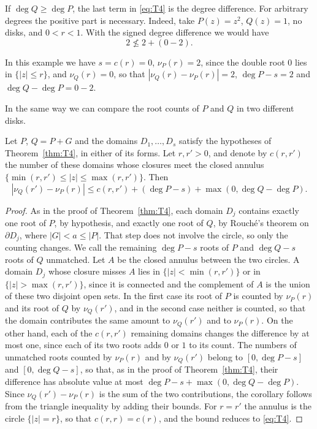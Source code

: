 \begin{remark}\label{rem:T4-degree}
If $\deg Q\geq\deg P$, the last term in \eqref{eq:T4} is the degree difference.
For arbitrary degrees the positive part is necessary. Indeed, take
$P(z)=z^2$, $Q(z)=1$, no disks, and $0<r<1$. With the signed degree
difference we would have
\[
 2\nleq2+(0-2).
\]
\end{remark}
In this example we have $s=c(r)=0$, $\nu_P(r)=2$, since the double root $0$
lies in $\{|z|\le r\}$, and $\nu_Q(r)=0$, so that $|\nu_Q(r)-\nu_P(r)|=2$,
$\deg P-s=2$ and $\deg Q-\deg P=0-2$.

In the same way we can compare the root counts of $P$ and $Q$ in two
different disks.

\begin{corollary}\label{cor:T4-two-radii}
Let $P$, $Q=P+G$ and the domains $D_1,\ldots,D_s$ satisfy the hypotheses of
Theorem~\ref{thm:T4}, in either of its forms. Let
$r,r'>0$, and denote by $c(r,r')$ the number of these domains whose
closures meet the closed annulus
$\{\min(r,r')\le|z|\le\max(r,r')\}$. Then
\[
 |\nu_Q(r')-\nu_P(r)|\leq c(r,r')+(\deg P-s)+\max(0,\deg Q-\deg P).
\]
\end{corollary}

\begin{proof}
As in the proof of Theorem~\ref{thm:T4}, each domain $D_j$ contains
exactly one root of $P$, by hypothesis, and exactly one root of $Q$, by
Rouch\'e's theorem on $\partial D_j$, where $|G|<a\le|P|$. That step
does not involve the circle, so only the counting changes. We call the
remaining $\deg P-s$ roots of $P$ and $\deg Q-s$ roots of $Q$ unmatched.
Let $A$ be the closed annulus between the two circles.
A domain $D_j$ whose closure misses $A$ lies in $\{|z|<\min(r,r')\}$ or in
$\{|z|>\max(r,r')\}$, since it is connected and the complement of $A$ is
the union of these two disjoint open sets. In the first case its root of
$P$ is counted by $\nu_P(r)$ and its root of $Q$ by $\nu_Q(r')$, and in
the second case neither is counted, so that the domain contributes the
same amount to $\nu_Q(r')$ and to $\nu_P(r)$. On the other hand, each of
the $c(r,r')$ remaining domains changes the difference by at most one,
since each of its two roots adds $0$ or $1$ to its count.
The numbers of unmatched roots counted by $\nu_P(r)$ and by $\nu_Q(r')$
belong to $[0,\deg P-s]$ and $[0,\deg Q-s]$, so that, as in the proof of
Theorem~\ref{thm:T4}, their difference has absolute value at most
$\deg P-s+\max(0,\deg Q-\deg P)$.
Since $\nu_Q(r')-\nu_P(r)$ is the sum of the two contributions, the
corollary follows from the triangle inequality by adding their bounds.
For $r=r'$ the annulus is the circle $\{|z|=r\}$, so that $c(r,r)=c(r)$,
and the bound reduces to \eqref{eq:T4}.
\end{proof}

